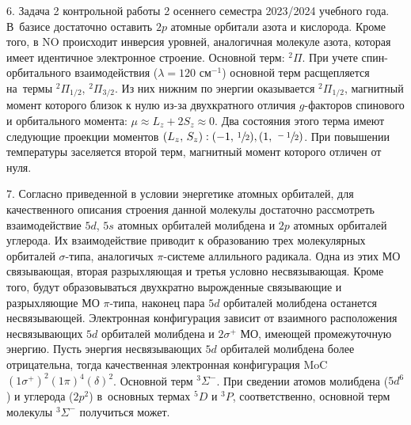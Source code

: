 6. Задача 2 контрольной работы 2 осеннего семестра 2023/2024 учебного года. В~базисе достаточно оставить $2p$ атомные орбитали азота и кислорода. Кроме того, в NO происходит инверсия уровней, аналогичная молекуле азота, которая имеет идентичное электронное строение. Основной терм: $^2\Pi$. При учете спин-орбитального взаимодействия ($\lambda=120$ см$^{-1}$) основной терм расщепляется на~термы $^2\Pi_{1/2}$, $^2\Pi_{3/2}$. Из них нижним по энергии оказывается $^2\Pi_{1/2}$, магнитный момент которого близок к нулю из-за двухкратного отличия $g$-факторов спинового и орбитального момента: $\mu \approx L_z + 2S_z \approx 0$. Два состояния этого терма имеют следующие проекции моментов $(L_z,\,S_z): (-1,\,\sfrac12), (1,\,\sfrac{-1}{2})$.  При повышении температуры заселяется второй терм, магнитный момент которого отличен от нуля.\par
7. Согласно приведенной в условии энергетике атомных орбиталей, для качественного описания строения данной молекулы достаточно рассмотреть взаимодействие $5d$, $5s$ атомных орбиталей молибдена и $2p$ атомных орбиталей углерода. Их взаимодействие приводит к образованию трех молекулярных орбиталей $\sigma$-типа, аналогичых $\pi$-системе аллильного радикала. Одна из этих МО связывающая, вторая разрыхляющая и третья условно несвязывающая. Кроме того, будут образовываться двухкратно вырожденные связывающие и разрыхляющие МО $\pi$-типа, наконец пара $5d$ орбиталей молибдена останется несвязывающей. Электронная конфигурация зависит от взаимного расположения несвязывающих $5d$ орбиталей молибдена и $2\sigma^+$ МО, имеющей промежуточную энергию. Пусть энергия несвязывающих $5d$ орбиталей молибдена более отрицательна, тогда качественная электронная конфигурация MoC $(1\sigma^+)^2(1\pi)^4(\delta)^2$. Основной терм $^3\Sigma^-$. При сведении атомов молибдена ($5d^6$) и углерода ($2p^2$) в~основных термах $^5D$ и $^3P$, соответственно, основной терм молекулы $^3\Sigma^-$ получиться может.\par
